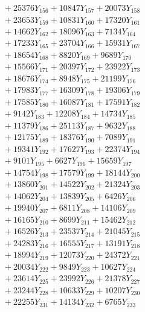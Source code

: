 \documentclass[a4paper,10pt]{article}
\begin{document}
{\begin{align}
&\;  + 25376 Y_{156} + 10847 Y_{157} + 20073 Y_{158} \\[0.3ex]
&\;  + 23653 Y_{159} + 10831 Y_{160} + 17320 Y_{161} \\[0.3ex]
&\;  + 14662 Y_{162} + 18096 Y_{163} + 7134 Y_{164} \\[0.3ex]
&\;  + 17233 Y_{165} + 23704 Y_{166} + 15931 Y_{167} \\[0.3ex]
&\;  + 18654 Y_{168} + 8820 Y_{169} + 9689 Y_{170} \\[0.3ex]
&\;  + 15566 Y_{171} + 20397 Y_{172} + 23922 Y_{173} \\[0.3ex]
&\;  + 18676 Y_{174} + 8948 Y_{175} + 21199 Y_{176} \\[0.3ex]
&\;  + 17983 Y_{177} + 16309 Y_{178} + 19306 Y_{179} \\[0.5ex]\allowbreak
&\;  + 17585 Y_{180} + 16087 Y_{181} + 17591 Y_{182} \\[0.3ex]
&\;  + 9142 Y_{183} + 12208 Y_{184} + 14734 Y_{185} \\[0.3ex]
&\;  + 11379 Y_{186} + 25113 Y_{187} + 9632 Y_{188} \\[0.3ex]
&\;  + 12175 Y_{189} + 18376 Y_{190} + 7089 Y_{191} \\[0.3ex]
&\;  + 19341 Y_{192} + 17627 Y_{193} + 22374 Y_{194} \\[0.3ex]
&\;  + 9101 Y_{195} + 6627 Y_{196} + 15659 Y_{197} \\[0.3ex]
&\;  + 14754 Y_{198} + 17579 Y_{199} + 18144 Y_{200} \\[0.3ex]
&\;  + 13860 Y_{201} + 14522 Y_{202} + 21324 Y_{203} \\[0.3ex]
&\;  + 14062 Y_{204} + 13839 Y_{205} + 6426 Y_{206} \\[0.3ex]
&\;  + 19940 Y_{207} + 6811 Y_{208} + 14106 Y_{209} \\[0.5ex]\allowbreak
&\;  + 16165 Y_{210} + 8699 Y_{211} + 15462 Y_{212} \\[0.3ex]
&\;  + 16526 Y_{213} + 23537 Y_{214} + 21045 Y_{215} \\[0.3ex]
&\;  + 24283 Y_{216} + 16555 Y_{217} + 13191 Y_{218} \\[0.3ex]
&\;  + 18994 Y_{219} + 12073 Y_{220} + 24372 Y_{221} \\[0.3ex]
&\;  + 20034 Y_{222} + 9849 Y_{223} + 10627 Y_{224} \\[0.3ex]
&\;  + 23614 Y_{225} + 23992 Y_{226} + 21378 Y_{227} \\[0.3ex]
&\;  + 23244 Y_{228} + 10633 Y_{229} + 10207 Y_{230} \\[0.3ex]
&\;  + 22255 Y_{231} + 14134 Y_{232} + 6765 Y_{233} \\[0.3ex]

\end{align}}
\end{document}

